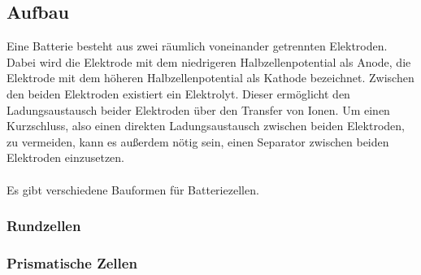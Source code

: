 \documentclass[a4paper, 11pt, headsepline,footsepline,twoside,abstract]{scrbook}
\begin{document}
\subsection{Aufbau}
Eine Batterie besteht aus zwei räumlich voneinander getrennten Elektroden. Dabei wird die Elektrode mit dem niedrigeren Halbzellenpotential als Anode, die Elektrode mit dem höheren Halbzellenpotential als Kathode bezeichnet. Zwischen den beiden Elektroden existiert ein Elektrolyt. Dieser ermöglicht den Ladungsaustausch beider Elektroden über den Transfer von Ionen. Um einen Kurzschluss, also einen direkten Ladungsaustausch zwischen beiden Elektroden, zu vermeiden, kann es außerdem nötig sein, einen Separator zwischen beiden Elektroden einzusetzen.
\\\\
Es gibt verschiedene Bauformen für Batteriezellen.
\subsubsection{Rundzellen}
\subsubsection{Prismatische Zellen}
\end{document}
